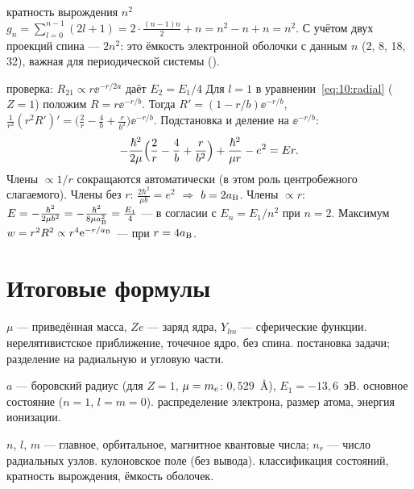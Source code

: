 \begin{derivation}[label=der:10:deg]{кратность вырождения $n^2$}
$g_n=\sum_{l=0}^{n-1}(2l+1)=2\cdot\frac{(n-1)n}{2}+n=n^2-n+n=n^2$. С учётом двух проекций спина — $2n^2$:
это ёмкость электронной оболочки с данным $n$ (2, 8, 18, 32), важная для периодической системы ().
\end{derivation}

\begin{derivation}[label=der:10:2p]{проверка: $R_{21}\propto r\ee^{-r/2a}$ даёт $E_2=E_1/4$}
Для $l=1$ в уравнении~\eqref{eq:10:radial} ($Z=1$) положим $R=r\ee^{-r/b}$. Тогда
$R'=(1-r/b)\ee^{-r/b}$, $\frac{1}{r^2}(r^2R')'=\bigl(\frac2r-\frac4b+\frac{r}{b^2}\bigr)\ee^{-r/b}$. Подстановка и деление на $\ee^{-r/b}$:
\[
  -\frac{\hbar^2}{2\mu}\Bigl(\frac2r-\frac4b+\frac{r}{b^2}\Bigr)+\frac{\hbar^2}{\mu r}-e^2=Er .
\]
Члены $\propto1/r$ сокращаются автоматически (в этом роль центробежного слагаемого). Члены без $r$:
$\frac{2\hbar^2}{\mu b}=e^2$ $\Rightarrow$ $b=2a_{\mathrm B}$. Члены $\propto r$: $E=-\frac{\hbar^2}{2\mu b^2}=-\frac{\hbar^2}{8\mu a_{\mathrm B}^2}=\frac{E_1}{4}$ — в согласии с $E_n=E_1/n^2$
при $n=2$. Максимум $w=r^2R^2\propto r^4\mathrm{e}^{-r/a_{\mathrm B}}$ — при $r=4a_{\mathrm B}$.
\end{derivation}

\section{Итоговые формулы}

 {$\mu$ — приведённая масса, $Ze$ — заряд ядра, $Y_{lm}$ — сферические функции.}
 {нерелятивистское приближение, точечное ядро, без спина.}
 {постановка задачи; разделение на радиальную и угловую части.}

 {$a$ — боровский радиус (для $Z=1$, $\mu=m_e$: $0{,}529$~Å), $E_1=-13{,}6$~эВ.}
 {основное состояние ($n=1$, $l=m=0$).}
 {распределение электрона, размер атома, энергия ионизации.}

 {$n$, $l$, $m$ — главное, орбитальное, магнитное квантовые числа; $n_r$ — число радиальных узлов.}
 {кулоновское поле (без вывода).}
 {классификация состояний, кратность вырождения, ёмкость оболочек.}

